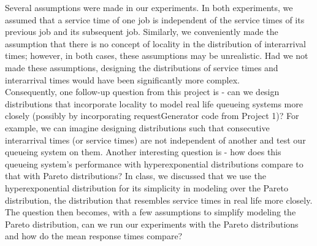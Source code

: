 \documentclass[12pt]{article}
\begin{document}
Several assumptions were made in our experiments. In both experiments, we assumed that a service time of one job is independent of the service times of its previous job and its subsequent job. Similarly, we conveniently made the assumption that there is no concept of locality in the distribution of interarrival times; however, in both cases, these assumptions may be unrealistic. Had we not made these assumptions, designing the distributions of service times and interarrival times would have been significantly more complex. \\

Consequently, one follow-up question from this project is - can we design distributions that incorporate locality to model real life queueing systems more closely (possibly by incorporating requestGenerator code from Project 1)?  For example, we can imagine designing distributions such that consecutive interarrival times (or service times) are not independent of another and test our queueing system on them. Another interesting question is - how does this queueing system's performance with hyperexponential distributions compare to that with Pareto distributions? In class, we discussed that we use the hyperexponential distribution for its simplicity in modeling over the Pareto distribution, the distribution that resembles service times in real life more closely. The question then becomes, with a few assumptions to simplify modeling the Pareto distribution, can we run our experiments with the Pareto distributions and how do the mean response times compare?
\end{document}
